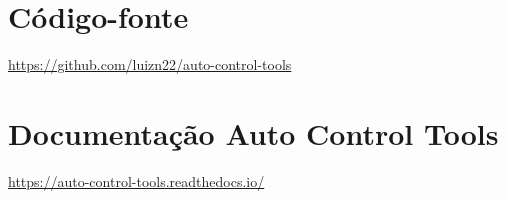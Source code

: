 \chapter{Código-fonte}
\label{ch:actgithub}
\url{https://github.com/luizn22/auto-control-tools}

\chapter{Documentação Auto Control Tools}
\label{ch:actdocs}
\url{https://auto-control-tools.readthedocs.io/}
